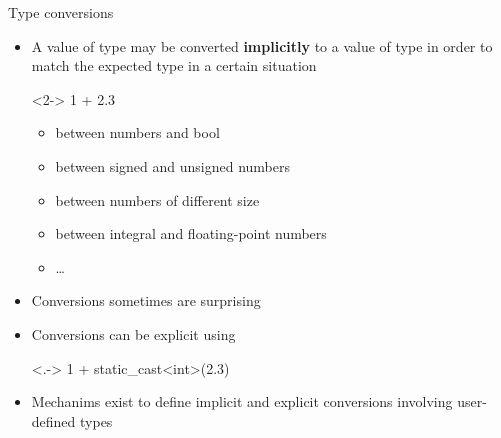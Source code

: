\begin{frame}[fragile]{Type conversions}

    \begin{itemize}
    \item A value of type  may be converted \textbf{implicitly} to a
      value of type  in order to match the expected type in a certain
      situation
      \begin{codeblock}<2->{
1 + 2.3}\end{codeblock}
      \begin{itemize}[<3->]
      \item between numbers and bool
      \item between signed and unsigned numbers
      \item between numbers of different size
      \item between integral and floating-point numbers
      \item \ldots
      \end{itemize}

    \item<4-> Conversions sometimes are surprising
    \item<5-> Conversions can be explicit using 
      \begin{codeblock}<.->{
1 + static_cast<int>(2.3)}\end{codeblock}
    \item<6-> Mechanims exist to define implicit and explicit conversions
      involving user-defined types

    \end{itemize}

\end{frame}

